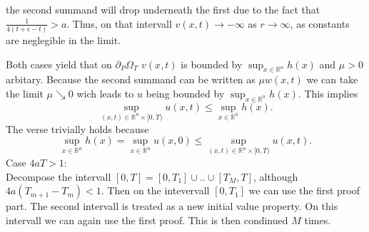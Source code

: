 \documentclass[A4,12pt,twoside]{book}
\begin{document}
{\begin{itemize}
        the second summand will drop underneath the first due to the fact that $\frac{1}{4 (t+ \epsilon -t)}> a$. Thus, on that intervall $v(x,t) \to - \infty$ as $r \to \infty$, as constants are neglegible in the limit.
    \end{itemize} 
    Both cases yield that on $\partial_P \Omega_T$ $v(x,t)$ is bounded by $\sup_{x \in \mathbb{R}^n} h(x)$ and $\mu >0$ arbitary. Because the second summand can be written as $\mu w(x,t)$ we can take the limit $\mu \searrow 0$ wich leads to $u$ being bounded by $\sup_{x \in \mathbb{R}^n} h(x)$. This implies 
    \[
    \sup_{(x,t) \in \mathbb{R}^n \times [0,T)} u(x,t) \leq \sup_{x \in \mathbb{R}^n} h(x).
    \]
    The verse trivially holds because 
    \[
   \sup_{x \in \mathbb{R}^n} h(x)= \sup_{x \in \mathbb{R}^n} u(x,0) \leq \sup_{(x,t) \in \mathbb{R}^n \times [0,T)} u(x,t). 
    \]
    Case $4aT>1$:\\
    Decompose the intervall $[0,T] = [0,T_1] \cup .. \cup [T_M,T]$, although $4a (T_{m+1}-T_m)<1$. Then on the intevervall $[0,T_1]$ we can use the first proof part. The second intervall is treated as a new initial value property. On this intervall we can again use the first proof. This is then condinued $M$ times.
}
\end{document}
